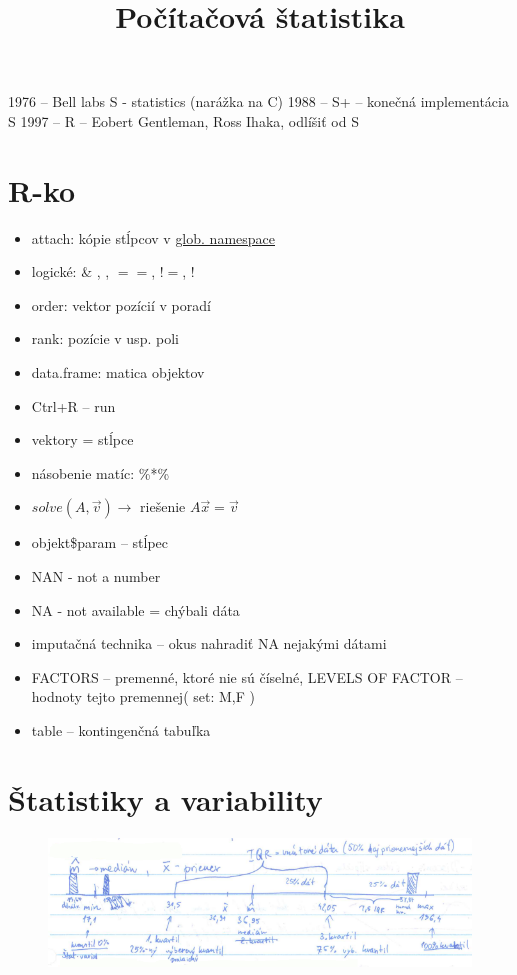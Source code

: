 \documentclass[unknownkeysallowed]{article}
\title{Počítačová štatistika}
\date{}
\begin{document}
\shorthandoff{-}
\maketitle

1976 -- Bell labs S - statistics (narážka na C)
1988 -- S+ -- konečná implementácia S
1997 -- R -- Eobert Gentleman, Ross Ihaka, odlíšiť od S

\section*{R-ko}
\begin{itemize}
\item attach: kópie stĺpcov v \underline{glob. namespace}
\item logické: \& , \textpipe , $==$, $!=$, !
\item order: vektor pozícií v poradí
\item rank: pozície v usp. poli
\item data.frame: matica objektov
\item Ctrl+R -- run
\item vektory = stĺpce
\item násobenie matíc: \%*\%
\item $solve(A,\vec{v}) \rightarrow$ riešenie $A\vec{x} = \vec{v}$
\item objekt\$param -- stĺpec
\item NAN - not a number
\item NA - not available = chýbali dáta
\item imputačná technika -- okus nahradiť NA nejakými dátami
\item FACTORS -- premenné, ktoré nie sú číselné, LEVELS OF FACTOR -- hodnoty tejto premennej( set: M,F )
\item table -- kontingenčná tabuľka
\end{itemize}

\section*{Štatistiky a variability}

\begin{figure}[ht]
\includegraphics[width=\textwidth]{imgs/obr1.png}
\centering
\end{figure}
\end{document}

